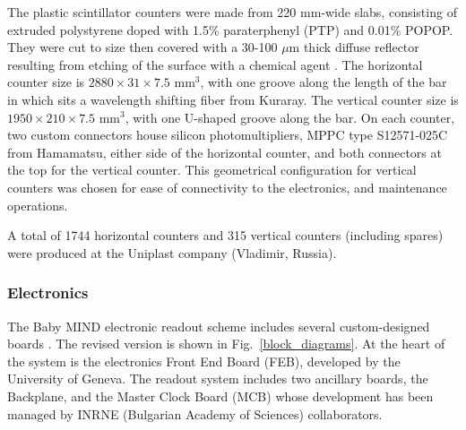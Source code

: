 The plastic scintillator counters were made from 220 mm-wide slabs, consisting of extruded polystyrene doped with 1.5\% paraterphenyl (PTP) and 0.01\% POPOP. They were cut to size then covered with a 30-100 $\mu$m thick diffuse reflector resulting from etching of the surface with a chemical agent \cite{Kudenko:2001qj, Mineev:2011xp}. The horizontal counter size is $2880 \times 31 \times 7.5 $ mm$^3$, with one groove along the length of the bar in which sits a wavelength shifting fiber from Kuraray. The vertical counter size is $1950 \times 210 \times 7.5 $ mm$^3$, with one U-shaped groove along the bar. On each counter, two custom connectors house silicon photomultipliers, MPPC type S12571-025C from Hamamatsu, either side of the horizontal counter, and both connectors at the top for the vertical counter. This geometrical configuration for vertical counters was chosen for ease of connectivity to the electronics, and maintenance operations.

A total of 1744 horizontal counters and 315 vertical counters (including spares) were produced at the Uniplast company (Vladimir, Russia).

\subsubsection{Electronics}
The Baby MIND electronic readout scheme includes several custom-designed boards \cite{Noah:2016ikh}. The revised version is shown in Fig.~\ref{block_diagrams}. At the heart of the system is the electronics Front End Board (FEB), developed by the University of Geneva. The readout system includes two ancillary boards, the Backplane, and the Master Clock Board (MCB) whose development has been managed by INRNE (Bulgarian Academy of Sciences) collaborators.



